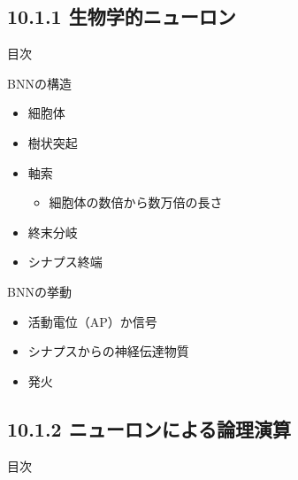 \documentclass[aspectratio=169, dvipdfmx, 14pt, xcolor={svgnames,dvipsnames}]{beamer}
\def\tightlist{\itemsep1pt\parskip0pt\parsep0pt}
\begin{document}

\hypertarget{ux751fux7269ux5b66ux7684ux30cbux30e5ux30fcux30edux30f3}{%
  \subsection{10.1.1
    生物学的ニューロン}\label{ux751fux7269ux5b66ux7684ux30cbux30e5ux30fcux30edux30f3}}
\begin{frame}{\quad 目次}
  \tableofcontents[currentsubsection]
\end{frame}


\begin{frame}{\quad BNNの構造}
  \begin{itemize}
    \item
          細胞体
    \item
          樹状突起
    \item
          軸索

          \begin{itemize}
            \tightlist
            \item
                  細胞体の数倍から数万倍の長さ
          \end{itemize}
    \item
          終末分岐
    \item
          シナプス終端
  \end{itemize}
\end{frame}


\begin{frame}{\quad BNNの挙動}
  \begin{itemize}
    \item
          活動電位（AP）か信号
    \item
          シナプスからの神経伝達物質
    \item
          発火
  \end{itemize}
\end{frame}


\hypertarget{ux30cbux30e5ux30fcux30edux30f3ux306bux3088ux308bux8ad6ux7406ux6f14ux7b97}{%
  \subsection{10.1.2
    ニューロンによる論理演算}\label{ux30cbux30e5ux30fcux30edux30f3ux306bux3088ux308bux8ad6ux7406ux6f14ux7b97}}
\begin{frame}{\quad 目次}
  \tableofcontents[currentsubsection]
\end{frame}
\end{document}
